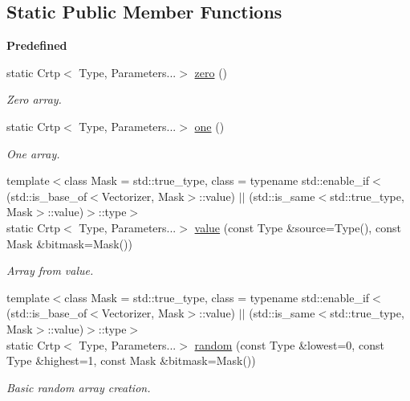 \subsection*{Static Public Member Functions}
\begin{Indent}{\bf Predefined}\par
\begin{DoxyCompactItemize}
\item 
static Crtp$<$ Type, Parameters...$>$ \hyperlink{classmagrathea_1_1AbstractNArray_a9e3e801b258247b8c3c1c576ad521775}{zero} ()
\begin{DoxyCompactList}\small\item\em Zero array. \end{DoxyCompactList}\item 
static Crtp$<$ Type, Parameters...$>$ \hyperlink{classmagrathea_1_1AbstractNArray_ad603ff336c72cdf527e12ca404158a8b}{one} ()
\begin{DoxyCompactList}\small\item\em One array. \end{DoxyCompactList}\item 
{\footnotesize template$<$class Mask  = std\-::true\-\_\-type, class  = typename std\-::enable\-\_\-if$<$(std\-::is\-\_\-base\-\_\-of$<$\-Vectorizer, Mask$>$\-::value) $|$$|$ (std\-::is\-\_\-same$<$std\-::true\-\_\-type, Mask$>$\-::value)$>$\-::type$>$ }\\static Crtp$<$ Type, Parameters...$>$ \hyperlink{classmagrathea_1_1AbstractNArray_ac382bb6cd34b432289442ca8da10ad4a}{value} (const Type \&source=Type(), const Mask \&bitmask=Mask())
\begin{DoxyCompactList}\small\item\em Array from value. \end{DoxyCompactList}\item 
{\footnotesize template$<$class Mask  = std\-::true\-\_\-type, class  = typename std\-::enable\-\_\-if$<$(std\-::is\-\_\-base\-\_\-of$<$\-Vectorizer, Mask$>$\-::value) $|$$|$ (std\-::is\-\_\-same$<$std\-::true\-\_\-type, Mask$>$\-::value)$>$\-::type$>$ }\\static Crtp$<$ Type, Parameters...$>$ \hyperlink{classmagrathea_1_1AbstractNArray_a78a0f1efc65617fc711adb9f23b55368}{random} (const Type \&lowest=0, const Type \&highest=1, const Mask \&bitmask=Mask())
\begin{DoxyCompactList}\small\item\em Basic random array creation. \end{DoxyCompactList}\item 

\end{DoxyCompactItemize}
\end{Indent}
